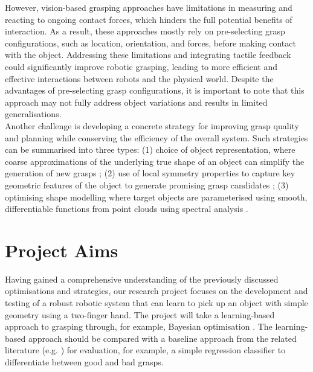 \documentclass[11pt, a4paper]{report}
\begin{document}
However, vision-based grasping approaches have limitations in measuring and reacting to ongoing contact forces, which hinders the full potential benefits of interaction. As a result, these approaches mostly rely on pre-selecting grasp configurations, such as location, orientation, and forces, before making contact with the object. Addressing these limitations and integrating tactile feedback could significantly improve robotic grasping, leading to more efficient and effective interactions between robots and the physical world. Despite the advantages of pre-selecting grasp configurations, it is important to note that this approach may not fully address object variations and results in limited generalisations.\\

Another challenge is developing a concrete strategy for improving grasp quality and planning while conserving the efficiency of the overall system. Such strategies can be summarised into three types: (1) choice of object representation, where coarse approximations of the underlying true shape of an object can simplify the generation of new grasps \cite{de_Farias_2021} \cite{geidenstam_2009}; (2) use of local symmetry properties to capture key geometric features of the object to generate promising grasp candidates \cite{de_Farias_2021}; (3) optimising shape modelling where target objects are parameterised using smooth, differentiable functions from point clouds using spectral analysis \cite{de_Farias_2021}.


\section{Project Aims}\label{sec:1.2}
Having gained a comprehensive understanding of the previously discussed optimisations and strategies, our research project focuses on the development and testing of a robust robotic system that can learn to pick up an object with simple geometry using a two-finger hand. The project will take a learning-based approach to grasping through, for example, Bayesian optimisation \cite{nogueira2016unscented, frazier2018tutorial}. The learning-based approach should be compared with a baseline approach from the related literature (e.g. \cite{nogueira2016unscented, danielczuk2020exploratory, breyer2020volumetric}) for evaluation, for example, a simple regression classifier to differentiate between good and bad grasps.
\end{document}
